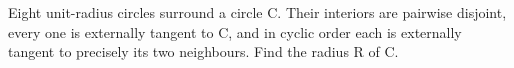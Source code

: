 Eight unit-radius circles surround a circle C. Their interiors are pairwise disjoint, every one is externally tangent to C, and in cyclic order each is externally tangent to precisely its two neighbours. Find the radius R of C.
